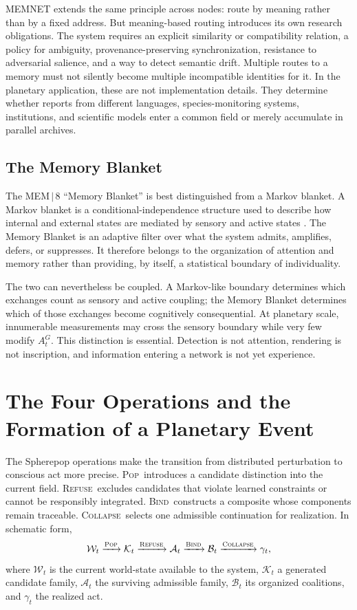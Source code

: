 \documentclass[11pt]{article}
\newcommand{\Pop}{\textsc{Pop}}
\newcommand{\Refuse}{\textsc{Refuse}}
\newcommand{\Bind}{\textsc{Bind}}
\newcommand{\Collapse}{\textsc{Collapse}}
\begin{document}
MEMNET extends the same principle across nodes: route by meaning rather than by a fixed address. But meaning-based routing introduces its own research obligations. The system requires an explicit similarity or compatibility relation, a policy for ambiguity, provenance-preserving synchronization, resistance to adversarial salience, and a way to detect semantic drift. Multiple routes to a memory must not silently become multiple incompatible identities for it. In the planetary application, these are not implementation details. They determine whether reports from different languages, species-monitoring systems, institutions, and scientific models enter a common field or merely accumulate in parallel archives.

\subsection{The Memory Blanket}
\label{sec:memory-blanket}

The MEM\,$|$\,8 ``Memory Blanket'' is best distinguished from a Markov blanket. A Markov blanket is a conditional-independence structure used to describe how internal and external states are mediated by sensory and active states \cite{kirchhoff2018}. The Memory Blanket is an adaptive filter over what the system admits, amplifies, defers, or suppresses. It therefore belongs to the organization of attention and memory rather than providing, by itself, a statistical boundary of individuality.

The two can nevertheless be coupled. A Markov-like boundary determines which exchanges count as sensory and active coupling; the Memory Blanket determines which of those exchanges become cognitively consequential. At planetary scale, innumerable measurements may cross the sensory boundary while very few modify $A_t^G$. This distinction is essential. Detection is not attention, rendering is not inscription, and information entering a network is not yet experience.

\section{The Four Operations and the Formation of a Planetary Event}
\label{sec:four-operations}

The Spherepop operations make the transition from distributed perturbation to conscious act more precise. \Pop\ introduces a candidate distinction into the current field. \Refuse\ excludes candidates that violate learned constraints or cannot be responsibly integrated. \Bind\ constructs a composite whose components remain traceable. \Collapse\ selects one admissible continuation for realization. In schematic form,
\[
\mathcal{W}_t
\xrightarrow{\Pop}
\mathcal{K}_t
\xrightarrow{\Refuse}
\mathcal{A}_t
\xrightarrow{\Bind}
\mathcal{B}_t
\xrightarrow{\Collapse}
\gamma_t,
\]
where $\mathcal{W}_t$ is the current world-state available to the system, $\mathcal{K}_t$ a generated candidate family, $\mathcal{A}_t$ the surviving admissible family, $\mathcal{B}_t$ its organized coalitions, and $\gamma_t$ the realized act.
\end{document}
